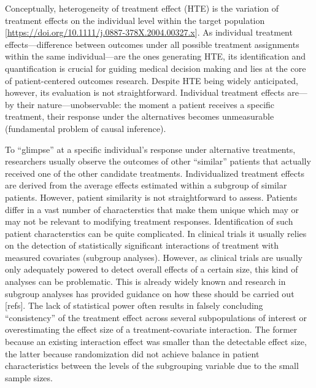 \documentclass[
]{book}
\begin{document}
Conceptually, heterogeneity of treatment effect (HTE) is the variation of
treatment effects on the individual level within the target population
{[}\url{https://doi.org/10.1111/j.0887-378X.2004.00327.x}{]}. As individual treatment
effects---difference between outcomes under all possible treatment assignments
within the same individual---are the ones generating HTE, its identification
and quantification is crucial for guiding medical decision making and lies at
the core of patient-centered outcomes research. Despite HTE being widely
anticipated, however, its evaluation is not straightforward. Individual
treatment effects are---by their nature---unobservable: the moment a
patient receives a specific treatment, their response under the alternatives
becomes unmeasurable (fundamental problem of causal inference).

To ``glimpse'' at a specific individual's response under alternative treatments,
researchers usually observe the outcomes of other ``similar'' patients that
actually received one of the other candidate treatments. Individualized
treatment effects are derived from the average effects estimated within a
subgroup of similar patients. However, patient similarity is not straightforward
to assess. Patients differ in a vast number of characterstics that make them
unique which may or may not be relevant to modifying treatment
responses. Identification of such patient characterstics can be quite
complicated. In clinical trials it usually relies on the detection of
statistically significant interactions of treatment with measured covariates
(subgroup analyses). However, as clinical trials are usually only adequately
powered to detect overall effects of a certain size, this kind of analyses can
be problematic. This is already widely known and research in subgroup analyses
has provided guidance on how these should be carried out {[}refs{]}. The lack of
statistical power often results in falsely concluding ``consistency'' of the
treatment effect across several subpopulations of interest or overestimating the
effect size of a treatment-covariate interaction. The former because an existing
interaction effect was smaller than the detectable effect size, the latter
because randomization did not achieve balance in patient characteristics between
the levels of the subgrouping variable due to the small sample sizes.
\end{document}
